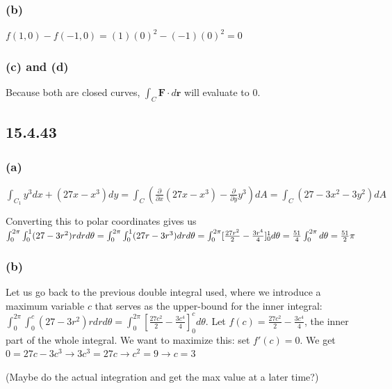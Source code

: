 \documentclass{article}
\begin{document}
\subsubsection{(b)}
\par\noindent\Large $f(1, 0) - f(-1, 0) = (1)(0)^{2} - (-1)(0)^{2} = 0$

\subsubsection{(c) and (d)}
\par\noindent\Large Because both are closed curves, $\int_{C}\textbf{F}\cdot d\textbf{r}$ will evaluate to 0.

\subsection{15.4.43}
\subsubsection{(a)}
\par\noindent\Large $\int_{C_{1}}y^{3}dx + (27x - x^{3})dy = \int_{C}(\frac{\partial}{\partial x}(27x - x^{3}) - \frac{\partial}{\partial y}y^{3})dA = \int_{C}(27 - 3x^{2} - 3y^{2})dA$
\par\noindent\Large Converting this to polar coordinates gives us $\int_{0}^{2\pi}\int_{0}^{1}(27 - 3r^{2})rdrd\theta = \linebreak \int_{0}^{2\pi}\int_{0}^{1}(27r - 3r^{3})drd\theta = \int_{0}^{2\pi}[\frac{27r^{2}}{2} - \frac{3r^{4}}{4}]_{0}^{1}d\theta = \frac{51}{4}\int_{0}^{2\pi}d\theta = \frac{51}{2}\pi$

\subsubsection{(b)}
\par\noindent\Large Let us go back to the previous double integral used, where we introduce a maximum variable $c$ that serves as the upper-bound for the inner integral: $\int_{0}^{2\pi}\int_{0}^{c}(27 - 3r^{2})rdrd\theta = \int_{0}^{2\pi}[\frac{27c^{2}}{2} - \frac{3c^{4}}{4}]_{0}^{c}d\theta$.  Let $f(c) = \frac{27c^{2}}{2} - \frac{3c^{4}}{4}$, the inner part of the whole integral.  We want to maximize this: set $f'(c) = 0$.  We get $0 = 27c - 3c^{3} \rightarrow 3c^{3} = 27c \rightarrow c^{2} = 9 \rightarrow c = 3$
\par\noindent (Maybe do the actual integration and get the max value at a later time?)
\end{document}
